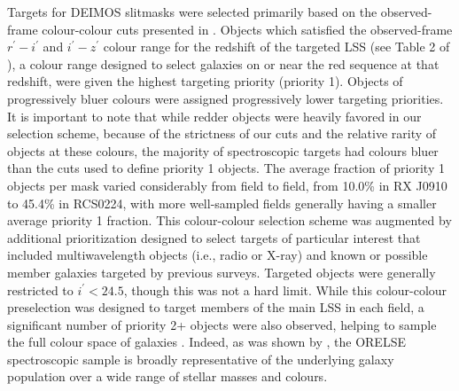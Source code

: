 \documentclass[a4paper,fleqn,usenatbib]{mnras}
\begin{document}
Targets for DEIMOS slitmasks were selected primarily based on the observed-frame colour-colour cuts presented in \citet{Lubin2009}. Objects which satisfied 
the observed-frame $r^{\prime}-i^{\prime}$ and $i^{\prime}-z^{\prime}$ colour range for the redshift of the targeted LSS (see Table 2 of \citealt{Lubin2009}), a colour
range designed to select galaxies on or near the red sequence at that redshift, were given the highest targeting priority (priority 1). Objects of progressively 
bluer colours were assigned progressively lower targeting priorities.
It is important to note that while redder objects were heavily favored in our selection scheme, because of the strictness of our cuts 
and the relative rarity of objects at these colours, the majority of spectroscopic targets had colours bluer than the cuts used to define priority 1 objects. 
The average fraction of priority 1 objects per mask varied considerably from field to field, from 10.0\% in RX J0910 to 45.4\% in RCS0224, with more well-sampled fields 
generally having a smaller average priority 1 fraction. This colour-colour selection scheme was augmented by additional prioritization designed 
to select targets of particular interest that included multiwavelength objects (i.e., radio or X-ray) and known or possible member galaxies
targeted by previous surveys. Targeted objects were generally restricted to $i^{\prime}<24.5$, though this was not a hard limit. 
While this colour-colour preselection was designed to target members of the main LSS in each field, a significant number of priority 2+ objects were also observed, helping to sample the full colour space of galaxies \citep[see][for a full description]{Lubin2009}.
Indeed, as was shown by \citet{Shen2017arxiv}, the ORELSE spectroscopic sample is broadly representative of the underlying galaxy population over a wide range of stellar masses and colours.
\end{document}

